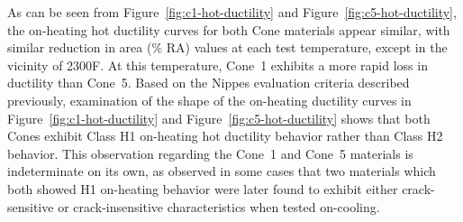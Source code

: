 As can be seen from Figure~\ref{fig:c1-hot-ductility} and Figure~\ref{fig:c5-hot-ductility}, the on-heating hot ductility curves for both Cone materials appear similar, with similar reduction in area (\% RA) values at each test temperature, except in the vicinity of 2300\textdegree{}F.  At this temperature, Cone~1 exhibits a more rapid loss in ductility than Cone~5.  Based on the Nippes evaluation criteria \cite{nippes_further_1957} described previously, examination of the shape of the on-heating ductility curves in Figure~\ref{fig:c1-hot-ductility} and Figure~\ref{fig:c5-hot-ductility} shows that both Cones exhibit Class H1 on-heating hot ductility behavior rather than Class H2 behavior.  This observation regarding the Cone~1 and Cone~5 materials is indeterminate on its own, as \citet{nippes_further_1957} observed in some cases that two materials which both showed H1 on-heating behavior were later found to exhibit either crack-sensitive or crack-insensitive characteristics when tested on-cooling.

